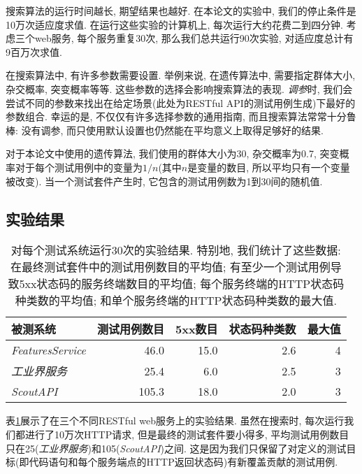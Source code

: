         搜索算法的运行时间越长, 期望结果也越好. 在本论文的实验中, 我们的停止条件是10万次适应度求值. 在运行这些实验的计算机上, 每次运行大约花费二到四分钟. 考虑三个web服务, 每个服务重复30次, 那么我们总共运行90次实验, 对适应度总计有9百万次求值. 
        
        在搜索算法中, 有许多参数需要设置. 举例来说, 在遗传算法中, 需要指定群体大小, 杂交概率, 突变概率等等. 这些参数的选择会影响搜索算法的表现. \textit{调参}时, 我们会尝试不同的参数来找出在给定场景(此处为RESTful API的测试用例生成)下最好的参数组合. 幸运的是, 不仅仅有许多选择参数的通用指南, 而且搜索算法常常十分鲁棒: 没有调参, 而只使用默认设置也仍然能在平均意义上取得足够好的结果\cite{Arcuri2013Parameter}. 
        
        对于本论文中使用的遗传算法, 我们使用的群体大小为30, 杂交概率为0.7, 突变概率对于每个测试用例中的变量为$1/n$(其中$n$是变量的数目, 所以平均只有一个变量被改变). 当一个测试套件产生时, 它包含的测试用例数为1到30间的随机值. 
    
    \subsection{实验结果}
    \label{5-3}
    
    \begin{table}
      \small
        \centering
      \begin{tabular}{lrrrr}
          \toprule
            被测系统 & 测试用例数目 & 5xx数目 & 状态码种类数 & 最大值 \\
            \midrule
            \textit{FeaturesService} & 46.0 & 15.0 & 2.6 & 4 \\
            \textit{工业界服务} & 25.4 & 6.0 & 2.5 & 3 \\
            \textit{ScoutAPI} & 105.3 & 18.0 & 2.0 & 3 \\
            \bottomrule
        \end{tabular}
        \caption{对每个测试系统运行30次的实验结果. 特别地, 我们统计了这些数据: 在最终测试套件中的测试用例数目的平均值; 有至少一个测试用例导致5xx状态码的服务终端数目的平均值; 每个服务终端的HTTP状态码种类数的平均值; 和单个服务终端的HTTP状态码种类数的最大值.}
      \label{table2}
    \end{table}
    
      表\ref{table2}展示了在三个不同RESTful web服务上的实验结果. 虽然在搜索时, 每次运行我们都进行了10万次HTTP请求, 但是最终的测试套件要小得多, 平均测试用例数目只在25(\textit{工业界服务})和105(\textit{ScoutAPI})之间. 这是因为我们只保留了对定义的测试目标(即代码语句和每个服务端点的HTTP返回状态码)有新覆盖贡献的测试用例.
    
